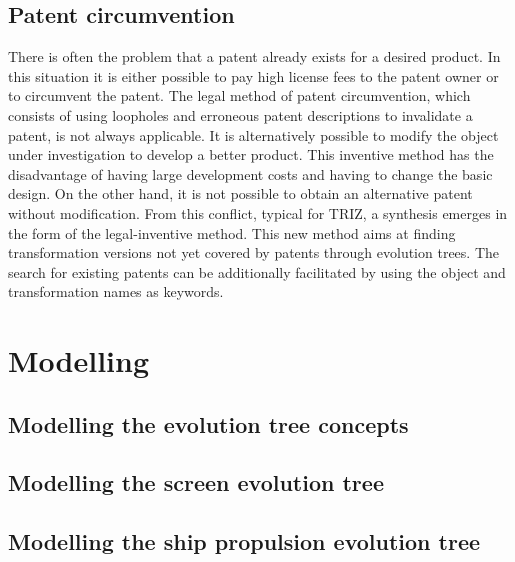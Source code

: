 \documentclass[11pt,a4paper]{article}
\begin{document}
\subsection{Patent circumvention}

There is often the problem that a patent already exists for a desired product. In this situation it is either possible to pay high license fees to the patent owner or to circumvent the patent.
The legal method of patent circumvention, which consists of using loopholes and erroneous patent descriptions to invalidate a patent, is not always applicable.
It is alternatively possible to modify the object under investigation to develop a better product. This inventive method has the disadvantage of having large development costs and having to change the basic design. On the other hand, it is not possible to obtain an alternative patent without modification.
From this conflict, typical for TRIZ, a synthesis emerges in the form of the legal-inventive method. This new method aims at finding transformation versions not yet covered by patents through evolution trees.
The search for existing patents can be additionally facilitated by using the object and transformation names as keywords.

\section{Modelling}

\subsection{Modelling the evolution tree concepts}

\subsection{Modelling the screen evolution tree}

\subsection{Modelling the ship propulsion evolution tree}
\end{document}
